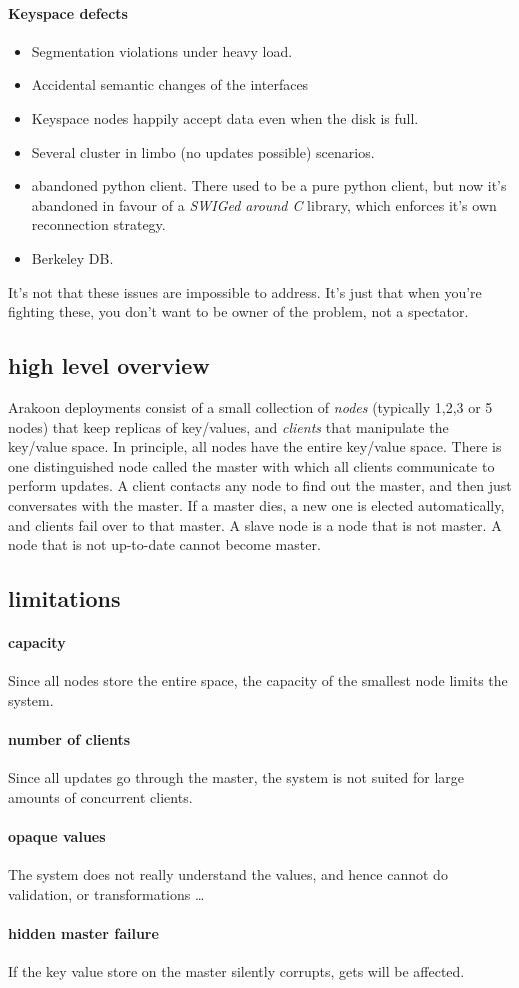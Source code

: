 \paragraph{Keyspace defects}
\begin{itemize}

\item{} Segmentation violations under heavy load.
\item{} Accidental semantic changes of the interfaces
\item{} Keyspace nodes happily accept data even when the disk is full.
\item{} Several cluster in limbo (no updates possible) scenarios.
\item{} abandoned python client. There used to be a pure python client, 
but now it's abandoned in favour of a \emph{SWIGed around C} library, 
which enforces it's own reconnection strategy.
\item{} Berkeley DB. 

\end{itemize}
It's not that these issues are impossible to address. It's just that when you're fighting these, you don't want to be owner of the problem, not a spectator.
\subsection{high level overview}
Arakoon deployments consist of a small collection of \emph{nodes} (typically 1,2,3 or 5 nodes) that keep replicas of key/values, and \emph{clients} that manipulate the key/value space.
In principle, all nodes have the entire key/value space.
There is one distinguished node called the master with which all clients communicate to perform updates.
A client contacts any node to find out the master, and then just conversates with the master.
If a master dies, a new one is elected automatically, and clients fail over to that master.
A slave node is a node that is not master.
A node that is not up-to-date cannot become master.

\subsection{limitations}
\paragraph{capacity}
Since all nodes store the entire space, the capacity of the smallest node limits the system.
\paragraph{number of clients}
Since all updates go through the master, the system is not suited for large amounts of concurrent clients.
\paragraph{opaque values}
The system does not really understand the values, and hence cannot do validation, or transformations \ldots
\paragraph{hidden master failure}
If the key value store on the master silently corrupts, gets will be affected.

